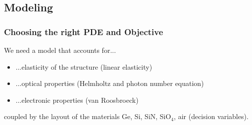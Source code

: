 \documentclass[aspectratio=169,xcolor=dvipsnames,10pt]{beamer}
\begin{document}
\subsection{Modeling}
\begin{frame}\frametitle{Choosing the right PDE and Objective}

\begin{example}
We need a model that accounts for...
\begin{itemize}
\item ...elasticity of the structure (linear elasticity)
\item ...optical properties (Helmholtz and photon number equation)
\item ...electronic properties (van Roosbroeck)
\end{itemize}
coupled by the layout of the materials Ge, Si, SiN, SiO$_4$, air (decision variables). \medskip
{}
\end{example}
\end{frame}
\end{document}
